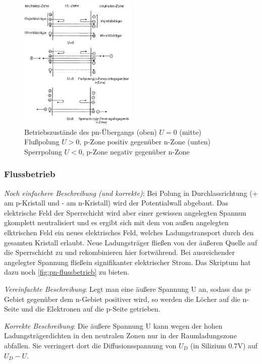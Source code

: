     
       \begin{figure}[H]
        \centering
        \includegraphics[width=0.5\textwidth]{fig/pn-betriebszustande}
        \caption{Betriebszustände des pn-Übergangs (oben) $U = 0$ (mitte) Flußpolung $U > 0$, p-Zone positiv gegenüber n-Zone (unten) Sperrpolung $U < 0$, p-Zone negativ gegenüber n-Zone}
        \label{fig:pn-betriebszustände}
    \end{figure}
    
    \subsubsection{Flussbetrieb}
    \emph{Noch einfachere Beschreibung (und korrekte)}: Bei Polung in Durchlassrichtung (+ am p-Kristall und - am n-Kristall) wird der Potentialwall abgebaut. Das elektrische Feld der Sperrschicht wird aber einer gewissen angelegten Spannun gkomplett neutralisiert und es ergibt sich mit dem von außen angelegten elktrischen Feld ein neues elektrisches Feld, welches Ladungstransport durch den gesamten Kristall erlaubt. Neue Ladungsträger fließen von der äußeren Quelle auf die Sperrschicht zu und rekombinieren hier fortwährend. Bei ausreichender angelegter Spannung fließein signifikanter elektrischer Strom.
    Das Skriptum hat dazu noch \autoref{fig:pn-flussbetrieb} zu bieten.
    
    \emph{Vereinfachte Beschreibung}: Legt man eine äußere Spannung U an, sodass das p-Gebiet gegenüber dem n-Gebiet positiver wird, so werden die Löcher auf die n-Seite und die Elektronen auf die p-Seite getrieben.
    
    \emph{Korrekte Beschreibung}: Die äußere Spannung U kann wegen der hohen Ladungsträgerdichten in den neutralen Zonen nur in der Raumladungszone abfallen. Sie verringert dort die Diffusionsspannung von $U_D$ (in Silizium 0.7V) auf $U_D-U$. 
    
